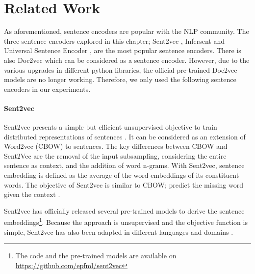 \section{Related Work}
\label{sec:sentence_related}
As aforementioned, sentence encoders are popular with the NLP community. The three sentence encoders explored in this chapter; Sent2vec \autocite{pagliardini-etal-2018-unsupervised}, Infersent \autocite{conneau-EtAl:2017:EMNLP2017} and Universal Sentence Encoder \autocite{cer2018universal}, are the most popular sentence encoders. There is also Doc2vec \autocite{pmlr-v32-le14} which can be considered as a sentence encoder. However, due to the various upgrades in different python libraries, the official pre-trained Doc2vec models are no longer working. Therefore, we only used the following sentence encoders in our experiments.

\paragraph{Sent2vec}
Sent2vec presents a simple but efficient unsupervised objective to train distributed representations of sentences \autocite{pagliardini-etal-2018-unsupervised}. It can be considered as an extension of Word2vec (CBOW) to sentences. The key differences between CBOW and Sent2Vec are the removal of the input subsampling, considering the entire sentence as context, and the addition of word n-grams. With Sent2vec, sentence embedding is defined as the average of the word embeddings of its constituent words. The objective of Sent2vec is similar to CBOW; predict the missing word given the context \autocite{pagliardini-etal-2018-unsupervised}. 

Sent2vec has officially released several pre-trained models to derive the sentence embeddings\footnote{The code and the pre-trained models are available on \url{https://github.com/epfml/sent2vec}}. Because the approach is unsupervised and the objective function is simple, Sent2vec has also been adapted in different languages and domains \autocite{Heo2021, zhu-etal-2018-exploring, Allot2019}.  


